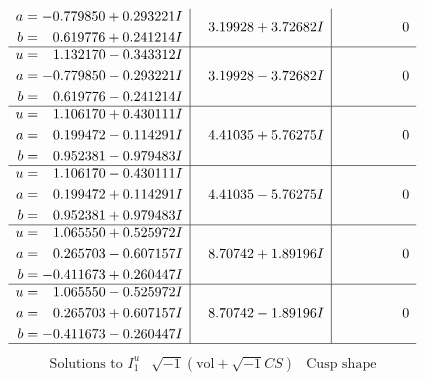 \documentclass[1p]{elsarticle_modified}
\theoremstyle{definition}
\newcommand{\I}{\sqrt{-1}}
\begin{document}
$$\begin{array}{c|c|c}
\begin{aligned}
a &= -0.779850 + 0.293221 I \\
b &= \phantom{-}0.619776 + 0.241214 I\end{aligned}
 & \phantom{-}3.19928 + 3.72682 I & \phantom{-0.000000 } 0 \\ \hline\begin{aligned}
u &= \phantom{-}1.132170 - 0.343312 I \\
a &= -0.779850 - 0.293221 I \\
b &= \phantom{-}0.619776 - 0.241214 I\end{aligned}
 & \phantom{-}3.19928 - 3.72682 I & \phantom{-0.000000 } 0 \\ \hline\begin{aligned}
u &= \phantom{-}1.106170 + 0.430111 I \\
a &= \phantom{-}0.199472 - 0.114291 I \\
b &= \phantom{-}0.952381 - 0.979483 I\end{aligned}
 & \phantom{-}4.41035 + 5.76275 I & \phantom{-0.000000 } 0 \\ \hline\begin{aligned}
u &= \phantom{-}1.106170 - 0.430111 I \\
a &= \phantom{-}0.199472 + 0.114291 I \\
b &= \phantom{-}0.952381 + 0.979483 I\end{aligned}
 & \phantom{-}4.41035 - 5.76275 I & \phantom{-0.000000 } 0 \\ \hline\begin{aligned}
u &= \phantom{-}1.065550 + 0.525972 I \\
a &= \phantom{-}0.265703 - 0.607157 I \\
b &= -0.411673 + 0.260447 I\end{aligned}
 & \phantom{-}8.70742 + 1.89196 I & \phantom{-0.000000 } 0 \\ \hline\begin{aligned}
u &= \phantom{-}1.065550 - 0.525972 I \\
a &= \phantom{-}0.265703 + 0.607157 I \\
b &= -0.411673 - 0.260447 I\end{aligned}
 & \phantom{-}8.70742 - 1.89196 I & \phantom{-0.000000 } 0\\
 \hline 
 \end{array}$$\newpage$$\begin{array}{c|c|c}  
\text{Solutions to }I^u_{1}& \I (\text{vol} + \sqrt{-1}CS) & \text{Cusp shape}\\
 \hline 
\begin{aligned}

\end{aligned}
\end{array}$$
\end{document}
